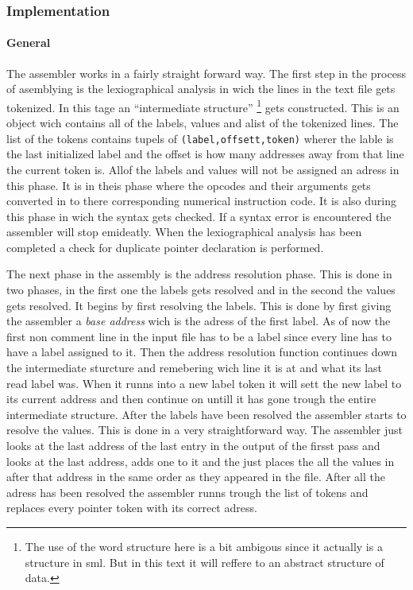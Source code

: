 \documentclass{article}
\begin{document}
\subsubsection{Implementation}
\paragraph{General}
The assembler works in a fairly straight forward way. The first step in the
process of asemblying is the lexiographical analysis in wich the lines in the
text file gets tokenized. In this tage an ``intermediate structure''
\footnote{The use of the word structure here is a bit ambigous since it
actually is a structure in sml. But in this text it will reffere to an abstract
structure of data.} gets constructed.
This is an object wich contains all of the labels, values and alist of the tokenized lines. The list of 
the tokens contains tupels of
\verb+(label,offsett,token)+ wherer the lable is the last initialized label and
the offset is how many addresses away from that line the current token is. Allof
the labels and values will not be assigned an adress in this phase. It is in
theis phase where the opcodes and their arguments gets converted in to there
corresponding numerical instruction code. It is also during this phase in wich
the syntax gets checked. If a syntax error is encountered the assembler will
stop emideatly. When the lexiographical analysis has been completed a check for
duplicate pointer declaration is performed.

The next phase in the assembly is the address resolution phase. This is done in
two phases, in the first one the labels gets resolved and in the second the
values gets  resolved. It begins by first resolving the labels.
This is done by first giving the assembler a \emph{base address} wich is 
the adress of the first label. As of now the first
non comment line in the input file has to be a label since every line has to
have a label assigned to it. Then the address resolution function continues down
the intermediate sturcture and remebering wich line it is at and what its last
read label was. When it runns into a new label token it will sett the new label
to its current address and then continue on untill it has gone trough the entire
intermediate structure. After the labels have been resolved the assembler starts
to resolve the values. This is done in a very straightforward way. The assembler
just looks at the last address of the last entry in the output of the firsst
pass and looks at the last address, adds one to it and the just places the all
the values in after that address in the same order as they appeared in the file.
After all the adress has been resolved the assembler runns trough the list of
tokens and replaces every pointer token with its correct adress.
\end{document}
